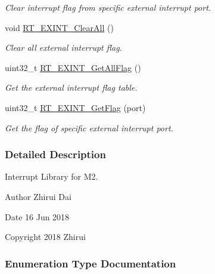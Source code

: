 \begin{DoxyCompactItemize}
\begin{DoxyCompactList}\small\item\em Clear interrupt flag from specific external interrupt port. \end{DoxyCompactList}\item 
void \mbox{\hyperlink{a00011_a62cc2402f1e2466bdd167cb75ad3cb74}{R\+T\+\_\+\+E\+X\+I\+N\+T\+\_\+\+Clear\+All}} ()
\begin{DoxyCompactList}\small\item\em Clear all external interrupt flag. \end{DoxyCompactList}\item 
uint32\+\_\+t \mbox{\hyperlink{a00011_a89b52c64e3041f59ff80bcc0a4682015}{R\+T\+\_\+\+E\+X\+I\+N\+T\+\_\+\+Get\+All\+Flag}} ()
\begin{DoxyCompactList}\small\item\em Get the external interrupt flag table. \end{DoxyCompactList}\item 
uint32\+\_\+t \mbox{\hyperlink{a00011_a359121bf1f9306a694a4958cb14f6e61}{R\+T\+\_\+\+E\+X\+I\+N\+T\+\_\+\+Get\+Flag}} (port)
\begin{DoxyCompactList}\small\item\em Get the flag of specific external interrupt port. \end{DoxyCompactList}\end{DoxyCompactItemize}


\subsubsection{Detailed Description}
Interrupt Library for M2. 

\begin{DoxyAuthor}{Author}
Zhirui Dai 
\end{DoxyAuthor}
\begin{DoxyDate}{Date}
16 Jun 2018 
\end{DoxyDate}
\begin{DoxyCopyright}{Copyright}
2018 Zhirui 
\end{DoxyCopyright}


\subsubsection{Enumeration Type Documentation}
\mbox{\label{a00011_af11f5754cc92430795a63bb53d964cd4}} 
